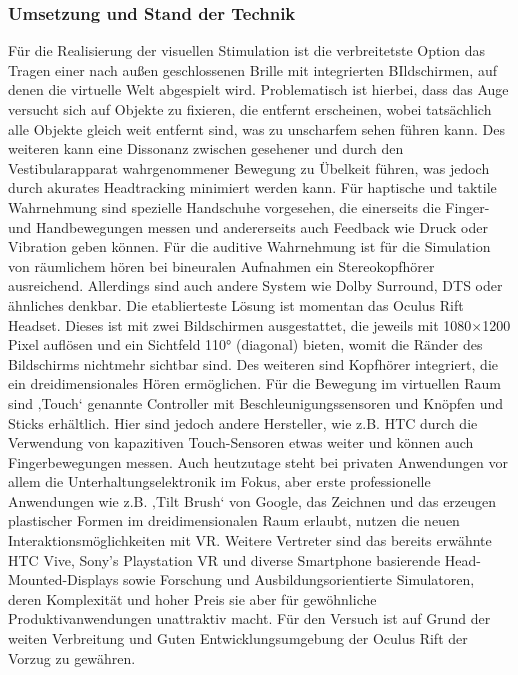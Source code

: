 \documentclass[12pt,a4paper,bibliography=totocnumbered,listof=totocnumbered]{scrartcl}
\begin{document}
\subsubsection{Umsetzung und Stand der Technik}
Für die Realisierung der visuellen Stimulation ist die verbreitetste Option das Tragen einer nach außen geschlossenen Brille mit integrierten BIldschirmen, auf denen die virtuelle Welt abgespielt wird. Problematisch ist hierbei, dass das Auge versucht sich auf Objekte zu fixieren, die entfernt erscheinen, wobei tatsächlich alle Objekte gleich weit entfernt sind, was zu unscharfem sehen führen kann. Des weiteren kann eine Dissonanz zwischen gesehener und durch den Vestibularapparat wahrgenommener Bewegung zu Übelkeit führen, was jedoch durch akurates Headtracking minimiert werden kann. 
Für haptische und taktile Wahrnehmung sind spezielle Handschuhe vorgesehen, die einerseits die Finger- und Handbewegungen messen und andererseits auch Feedback wie Druck oder Vibration geben können. Für die auditive Wahrnehmung ist für die Simulation von räumlichem hören bei bineuralen Aufnahmen ein Stereokopfhörer ausreichend. Allerdings sind auch andere System wie Dolby Surround, DTS oder ähnliches denkbar. 
Die etablierteste Lösung ist momentan das Oculus Rift Headset. Dieses ist mit zwei Bildschirmen ausgestattet, die jeweils mit 1080×1200 Pixel auflösen und ein Sichtfeld 110° (diagonal) bieten, womit die Ränder des Bildschirms nichtmehr sichtbar sind. 
Des weiteren sind Kopfhörer integriert, die ein dreidimensionales Hören ermöglichen.
Für die Bewegung im virtuellen Raum sind ‚Touch‘ genannte Controller mit Beschleunigungssensoren und Knöpfen und Sticks erhältlich. Hier sind jedoch andere Hersteller, wie z.B. HTC durch die Verwendung von kapazitiven Touch-Sensoren etwas weiter und können auch Fingerbewegungen messen.
Auch heutzutage steht bei privaten Anwendungen vor allem die Unterhaltungselektronik im Fokus, aber erste professionelle Anwendungen wie z.B. ‚Tilt Brush‘ von Google, das Zeichnen und das erzeugen plastischer Formen im dreidimensionalen Raum erlaubt, nutzen die neuen Interaktionsmöglichkeiten mit VR.
Weitere Vertreter sind das bereits erwähnte HTC Vive, Sony’s Playstation VR und diverse Smartphone basierende Head-Mounted-Displays sowie Forschung und Ausbildungsorientierte Simulatoren, deren Komplexität und hoher Preis sie aber für gewöhnliche Produktivanwendungen unattraktiv macht. 
Für den Versuch ist auf Grund der weiten Verbreitung und Guten Entwicklungsumgebung der Oculus Rift der Vorzug zu gewähren.
\end{document}
